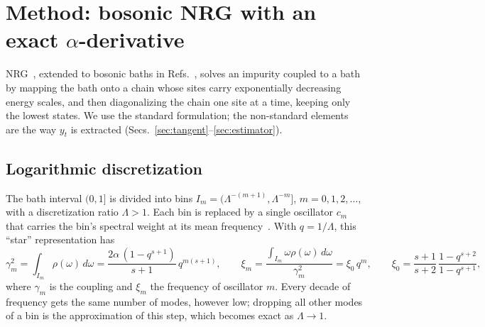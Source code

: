 \documentclass[10pt,a4paper]{article}
\begin{document}
\section{Method: bosonic NRG with an exact \texorpdfstring{$\alpha$}{alpha}-derivative}\label{sec:method}
NRG~\cite{Wilson1975,Bulla2008}, extended to bosonic baths in Refs.~\cite{Bulla2003,Bulla2005}, solves an impurity coupled to a bath
by mapping the bath onto a chain whose sites carry exponentially decreasing energy scales, and then diagonalizing the chain one site
at a time, keeping only the lowest states. We use the standard formulation; the non-standard elements are the way $y_t$ is extracted
(Secs.~\ref{sec:tangent}--\ref{sec:estimator}).

\subsection{Logarithmic discretization}
The bath interval $(0,1]$ is divided into bins $I_m=(\Lambda^{-(m+1)},\Lambda^{-m}]$, $m=0,1,2,\dots$, with a discretization ratio
$\Lambda>1$. Each bin is replaced by a single oscillator $c_m$ that carries the bin's spectral weight at its mean
frequency~\cite{Bulla2003,Bulla2005}. With $q=1/\Lambda$, this ``star'' representation has
\begin{equation}
\gamma_m^2=\int_{I_m}\!\rho(\omega)\,d\omega=\frac{2\alpha\,(1-q^{s+1})}{s+1}\,q^{m(s+1)},\qquad
\xi_m=\frac{\int_{I_m}\omega\rho(\omega)\,d\omega}{\gamma_m^2}=\xi_0\,q^m,\qquad \xi_0=\frac{s+1}{s+2}\,\frac{1-q^{s+2}}{1-q^{s+1}},
\label{eq:star}
\end{equation}
where $\gamma_m$ is the coupling and $\xi_m$ the frequency of oscillator $m$. Every decade of frequency gets the same number of modes,
however low; dropping all other modes of a bin is the approximation of this step, which becomes exact as $\Lambda\to1$.
\end{document}
